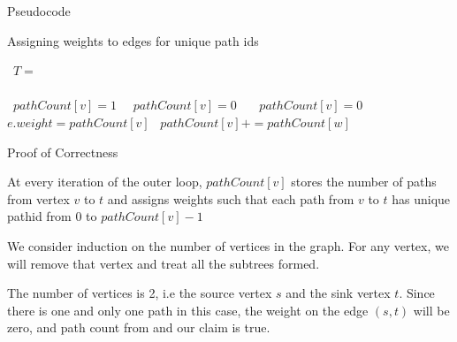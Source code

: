 \documentclass{article}
\begin{document}
\makeheader%

\begin{question}
    
	\begin{qsection}{Pseudocode}

		\begin{algorithm}[h!]
			\begin{algorithmic}[1]
			\caption{Assigning weights to edges for unique path ids}

													
					\State\ $T = $ 					
					\\\\															
																
								\State\ $pathCount[v] = 1$							
							\Else\
								\State\ $pathCount[v] = 0$
							\EndIf\
						\Else\
							\State\ $pathCount[v] = 0$
								\State\ $e.weight = pathCount[v]$					
								\State\ $pathCount[v] += pathCount[w]$
							\EndFor\
						\EndIf\
					\EndFor\
				\EndProcedure\
			\end{algorithmic}
		\end{algorithm}

	\end{qsection}

	\begin{qsection}{Proof of Correctness}

		\begin{qproof}{At every iteration of the outer loop, $pathCount[v]$ stores the number of paths from vertex $v$ to $t$ and assigns weights such that each path from $v$ to $t$ has unique pathid from 0 to $pathCount[v]-1$}
			
			We consider induction on the number of vertices in the graph. For any vertex, we will remove that vertex and treat all the subtrees formed.\br\

			 The number of vertices is 2, i.e the source vertex $s$ and the sink vertex $t$. Since there is one and only one path in this case, the weight on the edge $(s, t)$ will be zero, and path count from and our claim is true.
			

\end{qproof}
\end{qsection}
\end{question}
\end{document}
